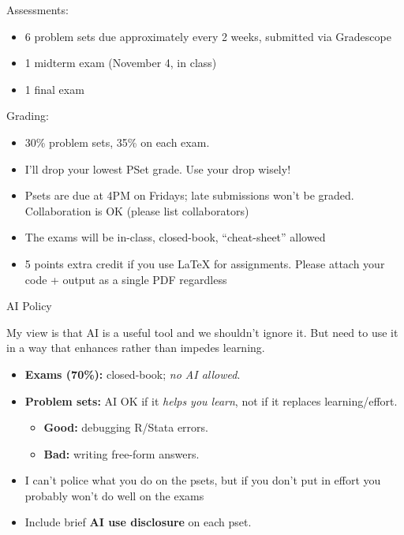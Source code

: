 \documentclass[11pt,english,handout]{beamer}
\begin{document}
\begin{frame}
\vspace{0.1cm}
Assessments:
\begin{itemize}
\item 6 problem sets due approximately every 2 weeks, submitted via Gradescope
\item 1 midterm exam (November 4, in class)
\item 1 final exam
\vspace{0.1cm}

\end{itemize}
\vspace{0.2cm}

\pause{}

Grading:

\begin{itemize}
\item 30\% problem sets, 35\%  on each exam.
\vspace{0.1cm}
\item
 I'll drop your lowest PSet grade. Use your drop wisely!
\vspace{0.1cm}
\item Psets are due at 4PM on Fridays; late submissions won't be graded.  Collaboration is OK (please list collaborators)
\vspace{0.1cm}
\item The exams will be in-class, closed-book, ``cheat-sheet'' allowed
\vspace{0.1cm}
\item 5 points extra credit if you use LaTeX for assignments. Please attach your code + output as a single PDF regardless
\end{itemize}
\vspace{0.2cm}

\end{frame}

\begin{frame}{AI Policy}

My view is that AI is a useful tool and we shouldn't ignore it. But need to use it in a way that enhances rather than impedes learning. \medskip
	
	\begin{itemize}
		\item \textbf{Exams (70\%):} closed-book; \emph{no AI allowed}.
		\item \textbf{Problem sets:} AI OK if it \emph{helps you learn}, not if it replaces learning/effort.
		\begin{itemize}
			\item \textbf{Good:} debugging R/Stata errors.
			\item \textbf{Bad:} writing free-form answers.
		\end{itemize}
		\item I can't police what you do on the psets, but if you don't put in effort you probably won't do well on the exams
		\item Include brief \textbf{AI use disclosure} on each pset.
	\end{itemize}
	
\end{frame}
\end{document}
